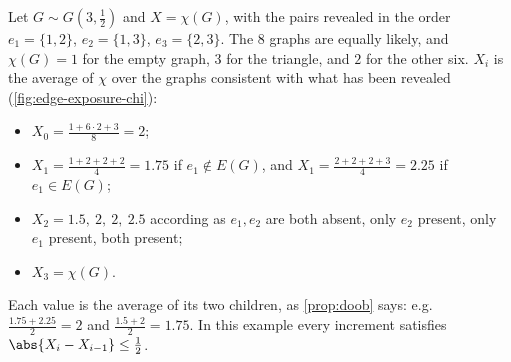 \begin{eg}\label{eg:edge-exposure-chi}
    Let \(G \sim G(3, \frac{1}{2})\) and \(X = \chi(G)\), with the pairs revealed in the order \(e_{1} = \{1, 2\}\), \(e_{2} = \{1, 3\}\), \(e_{3} = \{2, 3\}\). The \(8\) graphs are equally likely, and \(\chi(G) = 1\) for the empty graph, \(3\) for the triangle, and \(2\) for the other six. \(X_{i}\) is the average of \(\chi\) over the graphs consistent with what has been revealed (\autoref{fig:edge-exposure-chi}):
    \begin{itemize}
        \item \(X_{0} = \frac{1 + 6 \cdot 2 + 3}{8} = 2\);
        \item \(X_{1} = \frac{1 + 2 + 2 + 2}{4} = 1.75\) if \(e_{1} \notin E(G)\), and \(X_{1} = \frac{2 + 2 + 2 + 3}{4} = 2.25\) if \(e_{1} \in E(G)\);
        \item \(X_{2} = 1.5, \ 2, \ 2, \ 2.5\) according as \(e_{1}, e_{2}\) are both absent, only \(e_{2}\) present, only \(e_{1}\) present, both present;
        \item \(X_{3} = \chi(G)\).
    \end{itemize}
    Each value is the average of its two children, as \autoref{prop:doob} says: e.g.\ \(\frac{1.75 + 2.25}{2} = 2\) and \(\frac{1.5 + 2}{2} = 1.75\). In this example every increment satisfies \(\abs{X_{i} - X_{i-1}} \le \frac{1}{2}\).
\end{eg}

